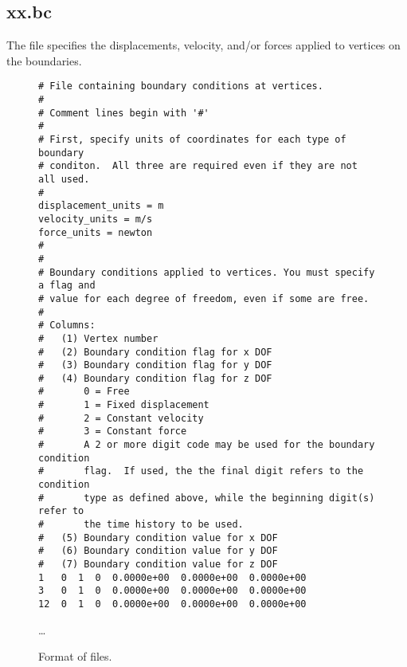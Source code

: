 \subsection{xx.bc}

The  file specifies the displacements, velocity,
and/or forces applied to vertices on the boundaries.

\begin{figure}[htbp]
  \begin{center}
\begin{verbatim}
# File containing boundary conditions at vertices.
#
# Comment lines begin with '#'
#
# First, specify units of coordinates for each type of boundary
# conditon.  All three are required even if they are not all used.
#
displacement_units = m
velocity_units = m/s
force_units = newton
#
#
# Boundary conditions applied to vertices. You must specify a flag and
# value for each degree of freedom, even if some are free.
#
# Columns:
#   (1) Vertex number
#   (2) Boundary condition flag for x DOF
#   (3) Boundary condition flag for y DOF
#   (4) Boundary condition flag for z DOF
#       0 = Free
#       1 = Fixed displacement
#       2 = Constant velocity
#       3 = Constant force
#       A 2 or more digit code may be used for the boundary condition
#       flag.  If used, the the final digit refers to the condition
#       type as defined above, while the beginning digit(s) refer to
#       the time history to be used.
#   (5) Boundary condition value for x DOF
#   (6) Boundary condition value for y DOF
#   (7) Boundary condition value for z DOF
1   0  1  0  0.0000e+00  0.0000e+00  0.0000e+00
3   0  1  0  0.0000e+00  0.0000e+00  0.0000e+00
12  0  1  0  0.0000e+00  0.0000e+00  0.0000e+00
\end{verbatim}
    \ldots
    \caption{Format of  files.}
  \end{center}
\end{figure}

